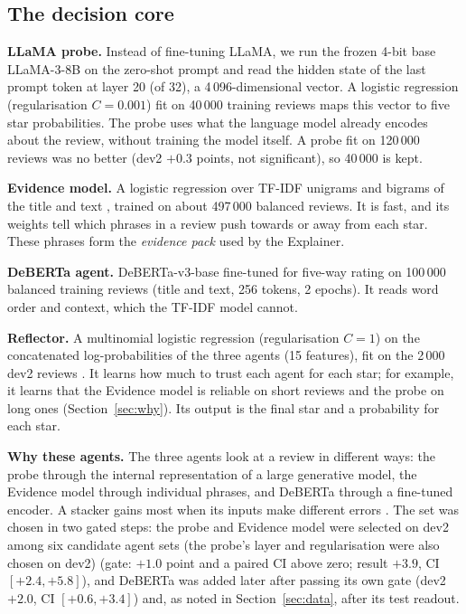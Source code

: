 \documentclass[runningheads]{llncs}
\begin{document}
\subsection{The decision core}

\textbf{LLaMA probe.} Instead of fine-tuning LLaMA, we run the frozen 4-bit base LLaMA-3-8B on the zero-shot prompt and read the hidden state of the last prompt token at layer 20 (of 32), a 4\,096-dimensional vector. A logistic regression (regularisation $C=0.001$) fit on 40\,000 training reviews maps this vector to five star probabilities. The probe uses what the language model already encodes about the review, without training the model itself. A probe fit on 120\,000 reviews was no better (dev2 $+0.3$ points, not significant), so 40\,000 is kept.

\textbf{Evidence model.} A logistic regression over TF-IDF unigrams and bigrams of the title and text \cite{salton1988}, trained on about 497\,000 balanced reviews. It is fast, and its weights tell which phrases in a review push towards or away from each star. These phrases form the \emph{evidence pack} used by the Explainer.

\textbf{DeBERTa agent.} DeBERTa-v3-base \cite{he2021debertav3} fine-tuned for five-way rating on 100\,000 balanced training reviews (title and text, 256 tokens, 2 epochs). It reads word order and context, which the TF-IDF model cannot.

\textbf{Reflector.} A multinomial logistic regression (regularisation $C=1$) on the concatenated log-probabilities of the three agents (15 features), fit on the 2\,000 dev2 reviews \cite{wolpert1992}. It learns how much to trust each agent for each star; for example, it learns that the Evidence model is reliable on short reviews and the probe on long ones (Section~\ref{sec:why}). Its output is the final star and a probability for each star.

\textbf{Why these agents.} The three agents look at a review in different ways: the probe through the internal representation of a large generative model, the Evidence model through individual phrases, and DeBERTa through a fine-tuned encoder. A stacker gains most when its inputs make different errors \cite{wolpert1992,dietterich2000ensemble}. The set was chosen in two gated steps: the probe and Evidence model were selected on dev2 among six candidate agent sets (the probe's layer and regularisation were also chosen on dev2) (gate: $+1.0$ point and a paired CI above zero; result $+3.9$, CI $[+2.4, +5.8]$), and DeBERTa was added later after passing its own gate (dev2 $+2.0$, CI $[+0.6, +3.4]$) and, as noted in Section~\ref{sec:data}, after its test readout.
\end{document}

